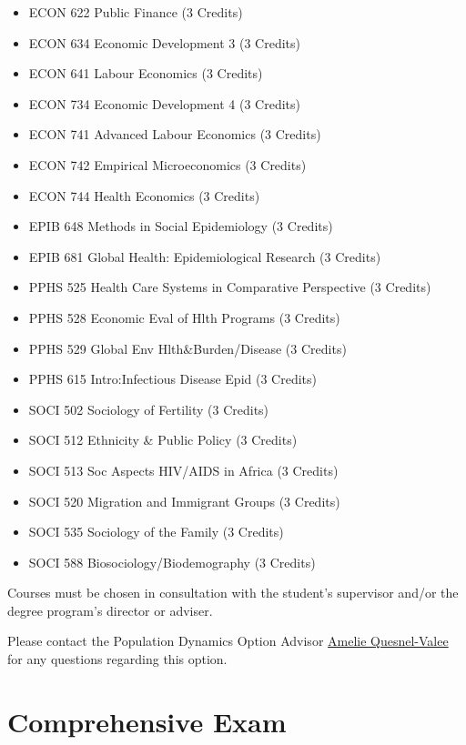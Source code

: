 \documentclass[
  openany]{book}
\providecommand{\tightlist}{%
  \setlength{\itemsep}{0pt}\setlength{\parskip}{0pt}}
\begin{document}
\begin{itemize}
\tightlist
\item
  ECON 622 Public Finance (3 Credits)
\item
  ECON 634 Economic Development 3 (3 Credits)
\item
  ECON 641 Labour Economics (3 Credits)
\item
  ECON 734 Economic Development 4 (3 Credits)
\item
  ECON 741 Advanced Labour Economics (3 Credits)
\item
  ECON 742 Empirical Microeconomics (3 Credits)
\item
  ECON 744 Health Economics (3 Credits)
\item
  EPIB 648 Methods in Social Epidemiology (3 Credits)
\item
  EPIB 681 Global Health: Epidemiological Research (3 Credits)
\item
  PPHS 525 Health Care Systems in Comparative Perspective (3 Credits)
\item
  PPHS 528 Economic Eval of Hlth Programs (3 Credits)
\item
  PPHS 529 Global Env Hlth\&Burden/Disease (3 Credits)
\item
  PPHS 615 Intro:Infectious Disease Epid (3 Credits)
\item
  SOCI 502 Sociology of Fertility (3 Credits)
\item
  SOCI 512 Ethnicity \& Public Policy (3 Credits)
\item
  SOCI 513 Soc Aspects HIV/AIDS in Africa (3 Credits)
\item
  SOCI 520 Migration and Immigrant Groups (3 Credits)
\item
  SOCI 535 Sociology of the Family (3 Credits)
\item
  SOCI 588 Biosociology/Biodemography (3 Credits)
\end{itemize}

Courses must be chosen in consultation with the student's supervisor and/or the degree program's director or adviser.

Please contact the Population Dynamics Option Advisor \href{mailto:amelie.quesnelvallee@mcgill.ca}{Amelie Quesnel-Valee} for any questions regarding this option.

\hypertarget{comprehensive-exam}{%
\chapter{Comprehensive Exam}\label{comprehensive-exam}}
\end{document}
